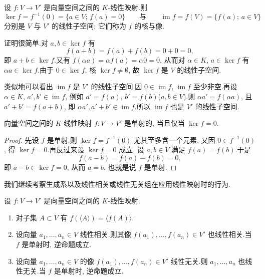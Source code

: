 \begin{remark}[核与像]\label{rem:2.1.3}
设 $f \colon V \longrightarrow V'$ 是向量空间之间的 $K$-线性映射.则
\[
\ker f = f^{-1}(0) = \{a \in V;\, f(a) = 0\} \qquad \text{与} \qquad \operatorname{im} f = f(V) = \{f(a);\, a \in V\}
\]
分别是 $V$ 与 $V'$ 的线性子空间; 它们称为 $f$ 的核与像.
\end{remark}

证明很简单.对 $a, b \in \ker f$ 有
\[
f(a + b) = f(a) + f(b) = 0 + 0 = 0,
\]
即 $a + b \in \ker f$.又有 $f(\alpha a) = \alpha f(a) = \alpha 0 = 0$, 从而对 $\alpha \in K$, $a \in \ker f$ 有 $\alpha a \in \ker f$.由于 $0 \in \ker f$, 核 $\ker f \neq \emptyset$, 故 $\ker f$ 是 $V$ 的线性子空间.

类似地可以看出 $\operatorname{im} f$ 是 $V'$ 的线性子空间.因 $0 \in \operatorname{im} f$, $\operatorname{im} f$ 至少非空.再设 $\alpha \in K$, $a', b' \in \operatorname{im} f$, 例如 $a' = f(a)$, $b' = f(b)$($a, b \in V$).则 $\alpha a' = f(\alpha a)$, 且 $a' + b' = f(a + b)$, 即 $\alpha a', a' + b' \in \operatorname{im} f$.所以 $\operatorname{im} f$ 也是 $V'$ 的线性子空间.

\begin{remark}[单射的刻画]\label{rem:2.1.4}
向量空间之间的 $K$-线性映射 $f \colon V \longrightarrow V'$ 是单射的, 当且仅当 $\ker f = 0$.
\end{remark}

\begin{proof}
先设 $f$ 是单射.则 $\ker f = f^{-1}(0)$ 尤其至多含一个元素, 又因 $0 \in f^{-1}(0)$, 得 $\ker f = 0$.再反过来设 $\ker f = 0$ 成立, 设 $a, b \in V$ 满足 $f(a) = f(b)$.于是
\[
f(a - b) = f(a) - f(b) = 0,
\]
即 $a - b \in \ker f = 0$, 从而 $a = b$, 也就是说 $f$ 是单射.
\end{proof}

我们继续考察生成系以及线性相关或线性无关组在应用线性映射时的行为.

\begin{remark}\label{rem:2.1.5}
设 $f \colon V \longrightarrow V'$ 是向量空间之间的 $K$-线性映射.
\begin{enumerate}
\item[(i)] 对子集 $A \subset V$ 有 $f(\langle A \rangle) = \langle f(A) \rangle$.
\item[(ii)] 设向量 $a_1, \ldots, a_n \in V$ 线性相关.则其像 $f(a_1), \ldots, f(a_n) \in V'$ 也线性相关.当 $f$ 是单射时, 逆命题成立.
\item[(iii)] 设向量 $a_1, \ldots, a_n \in V$ 的像 $f(a_1), \ldots, f(a_n) \in V'$ 线性无关.则 $a_1, \ldots, a_n$ 也线性无关.当 $f$ 是单射时, 逆命题成立.
\end{enumerate}
\end{remark}

